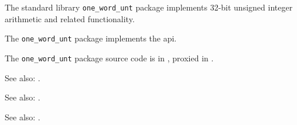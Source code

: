 
The standard library {\tt one\_word\_unt} package implements 32-bit unsigned integer arithmetic and related 
functionality.

The {\tt one\_word\_unt} package implements the  api.

The {\tt one\_word\_unt} package source code is in , 
proxied in .

See also: .

See also: .

See also: .
